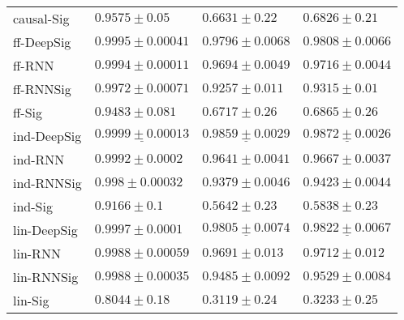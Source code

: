 \begin{tabular}{llll}
causal-Sig     &                              $ 0.9575 \pm 0.05 $ &                             $ 0.6631 \pm 0.22 $ &                             $ 0.6826 \pm 0.21 $ \\
ff-DeepSig     &                           $ 0.9995 \pm 0.00041 $ &                           $ 0.9796 \pm 0.0068 $ &                           $ 0.9808 \pm 0.0066 $ \\
ff-RNN         &                           $ 0.9994 \pm 0.00011 $ &                           $ 0.9694 \pm 0.0049 $ &                           $ 0.9716 \pm 0.0044 $ \\
ff-RNNSig      &                           $ 0.9972 \pm 0.00071 $ &                            $ 0.9257 \pm 0.011 $ &                             $ 0.9315 \pm 0.01 $ \\
ff-Sig         &                             $ 0.9483 \pm 0.081 $ &                             $ 0.6717 \pm 0.26 $ &                             $ 0.6865 \pm 0.26 $ \\
ind-DeepSig    &  $  \mathbf{ \underline{ 0.9999 \pm 0.00013 }} $ &  $  \mathbf{ \underline{ 0.9859 \pm 0.0029 }} $ &  $  \mathbf{ \underline{ 0.9872 \pm 0.0026 }} $ \\
ind-RNN        &                            $ 0.9992 \pm 0.0002 $ &                           $ 0.9641 \pm 0.0041 $ &                           $ 0.9667 \pm 0.0037 $ \\
ind-RNNSig     &                            $ 0.998 \pm 0.00032 $ &                           $ 0.9379 \pm 0.0046 $ &                           $ 0.9423 \pm 0.0044 $ \\
ind-Sig        &                               $ 0.9166 \pm 0.1 $ &                             $ 0.5642 \pm 0.23 $ &                             $ 0.5838 \pm 0.23 $ \\
lin-DeepSig    &                            $ 0.9997 \pm 0.0001 $ &            $  \underline{ 0.9805 \pm 0.0074 } $ &            $  \underline{ 0.9822 \pm 0.0067 } $ \\
lin-RNN        &                           $ 0.9988 \pm 0.00059 $ &                            $ 0.9691 \pm 0.013 $ &                            $ 0.9712 \pm 0.012 $ \\
lin-RNNSig     &                           $ 0.9988 \pm 0.00035 $ &                           $ 0.9485 \pm 0.0092 $ &                           $ 0.9529 \pm 0.0084 $ \\
lin-Sig        &                              $ 0.8044 \pm 0.18 $ &                             $ 0.3119 \pm 0.24 $ &                             $ 0.3233 \pm 0.25 $ \\

\end{tabular}
